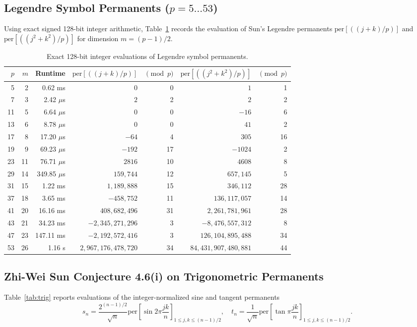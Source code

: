 \documentclass[11pt,a4paper]{article}
\theoremstyle{definition}
\theoremstyle{remark}
\begin{document}
\subsection{Legendre Symbol Permanents ($p = 5 \dots 53$)}
Using exact signed 128-bit integer arithmetic, Table~\ref{tab:legendre} records the evaluation of Sun's Legendre permanents $\mathrm{per}[((j+k)/p)]$ and $\mathrm{per}[((j^2+k^2)/p)]$ for dimension $m = (p-1)/2$.

\begin{table}[htbp]
\centering
\small
\caption{Exact 128-bit integer evaluations of Legendre symbol permanents.}
\label{tab:legendre}
\begin{tabular}{rrrrrrr}
\toprule
$p$ & $m$ & \textbf{Runtime} & $\mathrm{per}[((j+k)/p)]$ & $\pmod p$ & $\mathrm{per}[((j^2+k^2)/p)]$ & $\pmod p$ \\
\midrule
5  & 2  & 0.62 ms & $0$ & 0 & $1$ & 1 \\
7  & 3  & 2.42 $\mu$s & $2$ & 2 & $2$ & 2 \\
11 & 5  & 6.64 $\mu$s & $0$ & 0 & $-16$ & 6 \\
13 & 6  & 8.78 $\mu$s & $0$ & 0 & $41$ & 2 \\
17 & 8  & 17.20 $\mu$s & $-64$ & 4 & $305$ & 16 \\
19 & 9  & 69.23 $\mu$s & $-192$ & 17 & $-1024$ & 2 \\
23 & 11 & 76.71 $\mu$s & $2816$ & 10 & $4608$ & 8 \\
29 & 14 & 349.85 $\mu$s & $159,744$ & 12 & $657,145$ & 5 \\
31 & 15 & 1.22 ms & $1,189,888$ & 15 & $346,112$ & 28 \\
37 & 18 & 3.65 ms & $-458,752$ & 11 & $136,117,057$ & 14 \\
41 & 20 & 16.16 ms & $408,682,496$ & 31 & $2,261,781,961$ & 28 \\
43 & 21 & 34.23 ms & $-2,345,271,296$ & 3 & $-8,476,557,312$ & 8 \\
47 & 23 & 147.11 ms & $-2,192,572,416$ & 3 & $126,104,895,488$ & 34 \\
53 & 26 & 1.16 s & $2,967,176,478,720$ & 34 & $84,431,907,480,881$ & 44 \\
\bottomrule
\end{tabular}
\end{table}

\subsection{Zhi-Wei Sun Conjecture 4.6(i) on Trigonometric Permanents}
Table~\ref{tab:trig} reports evaluations of the integer-normalized sine and tangent permanents
\begin{equation}
s_n = \frac{2^{(n-1)/2}}{\sqrt{n}} \mathrm{per}\left[\sin 2\pi \frac{jk}{n}\right]_{1 \le j,k \le (n-1)/2}, \quad t_n = \frac{1}{\sqrt{n}} \mathrm{per}\left[\tan \pi \frac{jk}{n}\right]_{1 \le j,k \le (n-1)/2}.
\end{equation}
\end{document}

